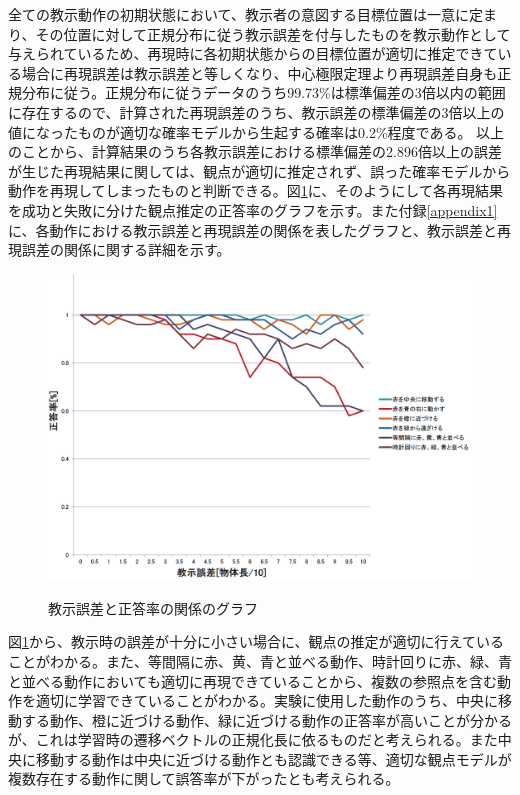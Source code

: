 全ての教示動作の初期状態において、教示者の意図する目標位置は一意に定まり、その位置に対して正規分布に従う教示誤差を付与したものを教示動作として与えられているため、再現時に各初期状態からの目標位置が適切に推定できている場合に再現誤差は教示誤差と等しくなり、中心極限定理より再現誤差自身も正規分布に従う。正規分布に従うデータのうち99.73\%は標準偏差の3倍以内の範囲に存在するので、計算された再現誤差のうち、教示誤差の標準偏差の3倍以上の値になったものが適切な確率モデルから生起する確率は0.2\%程度である。
以上のことから、計算結果のうち各教示誤差における標準偏差の2.896倍以上の誤差が生じた再現結果に関しては、観点が適切に推定されず、誤った確率モデルから動作を再現してしまったものと判断できる。図\ref{figure:success_rate}に、そのようにして各再現結果を成功と失敗に分けた観点推定の正答率のグラフを示す。また付録\ref{appendix1}に、各動作における教示誤差と再現誤差の関係を表したグラフと、教示誤差と再現誤差の関係に関する詳細を示す。
	\begin{figure}[h]
		\begin{center}
			\includegraphics[width=14cm]{chart2.png} \\ %
			\caption{教示誤差と正答率の関係のグラフ}
			\label{figure:success_rate}
		\end{center}
	\end{figure}

図\ref{figure:success_rate}から、教示時の誤差が十分に小さい場合に、観点の推定が適切に行えていることがわかる。また、等間隔に赤、黄、青と並べる動作、時計回りに赤、緑、青と並べる動作においても適切に再現できていることから、複数の参照点を含む動作を適切に学習できていることがわかる。実験に使用した動作のうち、中央に移動する動作、橙に近づける動作、緑に近づける動作の正答率が高いことが分かるが、これは学習時の遷移ベクトルの正規化長に依るものだと考えられる。また中央に移動する動作は中央に近づける動作とも認識できる等、適切な観点モデルが複数存在する動作に関して誤答率が下がったとも考えられる。




